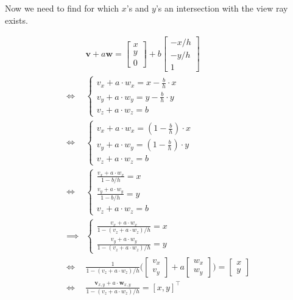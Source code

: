 \documentclass{article}
\renewcommand{\vec}{\mathbf}
\begin{document}
Now we need to find for which $x$'s and $y$'s an intersection with the view ray exists.

\begin{align*}
    & \vec{v} + a \vec{w} = \begin{bmatrix}
        x \\
        y \\
        0
    \end{bmatrix}
    +
    b
    \begin{bmatrix}
        -x/h \\
        -y/h \\
        1
    \end{bmatrix}\\
    \iff & \begin{cases}
        v_x + a \cdot w_x = x - \frac{b}{h} \cdot x \\
        v_y + a \cdot w_y = y - \frac{b}{h} \cdot y \\
        v_z + a \cdot w_z = b
    \end{cases}\\
    \iff & \begin{cases}
        v_x + a \cdot w_x = (1 - \frac{b}{h}) \cdot x \\
        v_y + a \cdot w_y = (1 - \frac{b}{h}) \cdot y \\
        v_z + a \cdot w_z = b
    \end{cases}\\
    \iff & \begin{cases}
        \frac{v_x + a \cdot w_x}{1 - b/h} = x \\
        \frac{v_y + a \cdot w_y}{1 - b/h} = y \\
        v_z + a \cdot w_z = b
    \end{cases}\\
    \implies & \begin{cases}
        \frac{v_x + a \cdot w_x}{1 - (v_z + a \cdot w_z)/h} = x \\
        \frac{v_y + a \cdot w_y}{1 - (v_z + a \cdot w_z)/h} = y
    \end{cases}\\
    \iff & \frac{1}{1 - (v_z + a \cdot w_z)/h}
    \bigg(
        \begin{bmatrix}
            v_x \\
            v_y
        \end{bmatrix}
        +
        a
        \begin{bmatrix}
            w_x \\
            w_y
        \end{bmatrix}
    \bigg)
    =
    \begin{bmatrix}
        x \\
        y
    \end{bmatrix}\\
    \iff & \frac{\vec{v}_{x,y} + a \cdot \vec{w}_{x,y}}{1 - (v_z + a \cdot w_z)/h} = [x, y]^\top
\end{align*}
\end{document}
